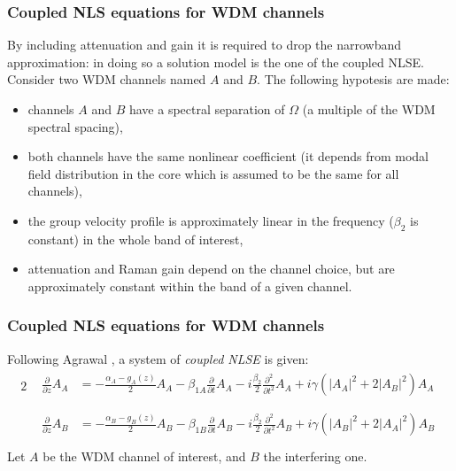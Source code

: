 \documentclass[8pt]{beamer} %
\begin{document}
\begin{frame}
    \frametitle{Coupled NLS equations for WDM channels}
    By including attenuation and gain it is required to drop the narrowband approximation: in doing so a solution model is the one of the coupled NLSE.\\
    Consider two WDM channels named $A$ and $B$.
    The following hypotesis are made:
    \begin{itemize}
        \item channels $A$ and $B$ have a spectral separation of $\Omega$ (a multiple of the WDM spectral spacing),
        \item both channels have the same nonlinear coefficient (it depends from modal field distribution in the core which is assumed to be the same for all channels),
        \item the group velocity profile is approximately linear in the frequency ($\beta_2$ is constant) in the whole band of interest,
        \item attenuation and Raman gain depend on the channel choice, but are approximately constant within the band of a given channel.
    \end{itemize}
\end{frame}

\begin{frame}
    \frametitle{Coupled NLS equations for WDM channels}
    Following Agrawal \cite[p.263]{Agrawal}, a system of \textit{coupled NLSE} is given:
    \begin{alignat}{2}
         & \begin{aligned}
               \frac{\partial}{\partial z} A_A & = -\frac{\alpha_A - g_A(z)}{2}A_A - \beta_{1A} \frac{\partial}{\partial t} A_A -  i \frac{\beta_2}{2} \frac{\partial^2}{\partial t^2} A_A + i \gamma (|A_A|^2 +2 |A_B|^2)A_A \\
           \end{aligned}\label{eq:nlA} \\
         & \begin{aligned}
               \frac{\partial}{\partial z} A_B & = -\frac{\alpha_B - g_B(z)}{2}A_B - \beta_{1B} \frac{\partial}{\partial t} A_B - i \frac{\beta_2}{2} \frac{\partial^2}{\partial t^2} A_B + i \gamma (|A_B|^2 +2 |A_A|^2)A_B \\
           \end{aligned}\label{eq:nlB}
    \end{alignat}
    Let $A$ be the WDM channel of interest, and $B$ the interfering one.
\end{frame}
\end{document}
